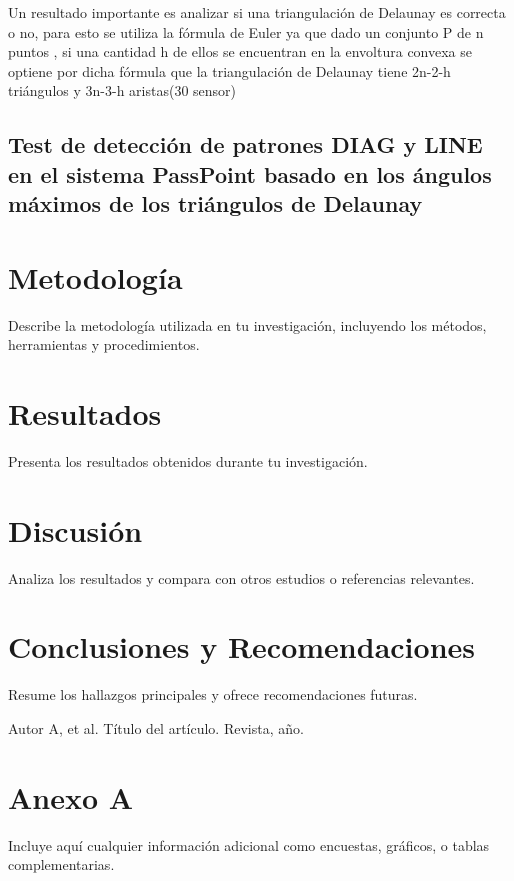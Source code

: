 \documentclass[12pt]{report}
\begin{document}
	
	Un resultado importante es analizar si una triangulación de Delaunay es correcta o no, para esto se utiliza la fórmula de Euler ya que dado un conjunto P de n puntos , si una cantidad h de ellos se encuentran en la envoltura convexa se optiene por dicha fórmula que  la triangulación de Delaunay tiene 2n-2-h triángulos y 3n-3-h aristas(30 sensor)
	
\section{Test de detección de patrones DIAG y LINE en el sistema PassPoint basado en los ángulos máximos de los triángulos de Delaunay  }
	
\chapter{Metodología}
Describe la metodología utilizada en tu investigación, incluyendo los métodos, herramientas y procedimientos.

\chapter{Resultados}
Presenta los resultados obtenidos durante tu investigación.

\chapter{Discusión}
Analiza los resultados y compara con otros estudios o referencias relevantes.

\chapter{Conclusiones y Recomendaciones}
Resume los hallazgos principales y ofrece recomendaciones futuras.


\begin{thebibliography}{9}
	 Autor A, et al. Título del artículo. Revista, año.
\end{thebibliography}


\appendix
\chapter{Anexo A}
Incluye aquí cualquier información adicional como encuestas, gráficos, o tablas complementarias.
\end{document}
